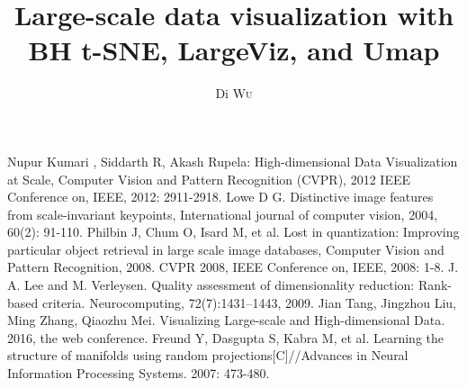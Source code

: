 \documentclass{EPL-master-thesis-covers-EN}
\title{Large-scale data visualization with BH t-SNE, LargeViz, and Umap}
\author{Di \textsc{Wu}}
\begin{document}
  \maketitle
  
\thispagestyle{empty}		%



\listoftodos

\tableofcontents
\newpage


% 





\begin{thebibliography}{99}  
Nupur Kumari , Siddarth R, Akash Rupela: High-dimensional Data Visualization at Scale, Computer Vision and Pattern Recognition (CVPR), 2012 IEEE Conference on, IEEE, 2012: 2911-2918.  
Lowe D G. Distinctive image features from scale-invariant keypoints, International journal of computer vision, 2004, 60(2): 91-110.  
Philbin J, Chum O, Isard M, et al. Lost in quantization: Improving particular object retrieval in large scale image databases, Computer Vision and Pattern Recognition, 2008. CVPR 2008, IEEE Conference on, IEEE, 2008: 1-8.
J. A. Lee and M. Verleysen. Quality assessment of dimensionality reduction: Rank-based criteria. Neurocomputing, 72(7):1431–1443, 2009.
Jian Tang, Jingzhou Liu, Ming Zhang, Qiaozhu Mei. Visualizing Large-scale and High-dimensional Data. 2016, the web conference.
Freund Y, Dasgupta S, Kabra M, et al. Learning the structure of manifolds using random projections[C]//Advances in Neural Information Processing Systems. 2007: 473-480.

\end{thebibliography}

  \backcoverpage
\end{document}
